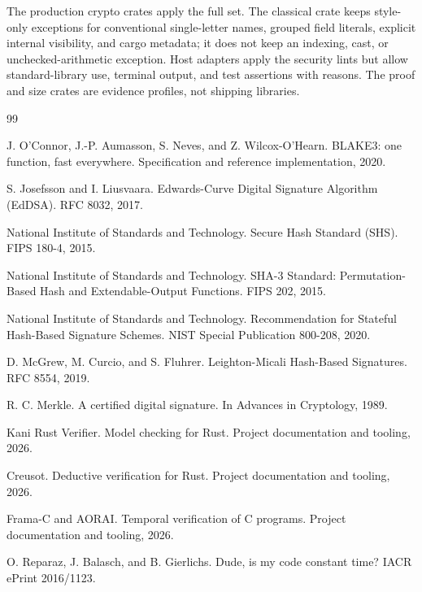 \documentclass[11pt,a4paper]{article}
\begin{document}
The production crypto crates apply the full set. The classical crate keeps
style-only exceptions for conventional single-letter names, grouped field
literals, explicit internal visibility, and cargo metadata; it does not keep an
indexing, cast, or unchecked-arithmetic exception. Host adapters apply the
security lints but allow standard-library use, terminal output, and test
assertions with reasons. The proof and size crates are evidence profiles, not
shipping libraries.

\begin{thebibliography}{99}

J. O'Connor, J.-P. Aumasson, S. Neves, and Z. Wilcox-O'Hearn.
\newblock BLAKE3: one function, fast everywhere.
\newblock Specification and reference implementation, 2020.

S. Josefsson and I. Liusvaara.
\newblock Edwards-Curve Digital Signature Algorithm (EdDSA).
\newblock RFC 8032, 2017.

National Institute of Standards and Technology.
\newblock Secure Hash Standard (SHS).
\newblock FIPS 180-4, 2015.

National Institute of Standards and Technology.
\newblock SHA-3 Standard: Permutation-Based Hash and Extendable-Output
Functions.
\newblock FIPS 202, 2015.

National Institute of Standards and Technology.
\newblock Recommendation for Stateful Hash-Based Signature Schemes.
\newblock NIST Special Publication 800-208, 2020.

D. McGrew, M. Curcio, and S. Fluhrer.
\newblock Leighton-Micali Hash-Based Signatures.
\newblock RFC 8554, 2019.

R. C. Merkle.
\newblock A certified digital signature.
\newblock In Advances in Cryptology, 1989.

Kani Rust Verifier.
\newblock Model checking for Rust.
\newblock Project documentation and tooling, 2026.

Creusot.
\newblock Deductive verification for Rust.
\newblock Project documentation and tooling, 2026.

Frama-C and AORAI.
\newblock Temporal verification of C programs.
\newblock Project documentation and tooling, 2026.

O. Reparaz, J. Balasch, and B. Gierlichs.
\newblock Dude, is my code constant time?
\newblock IACR ePrint 2016/1123.


\end{thebibliography}
\end{document}
